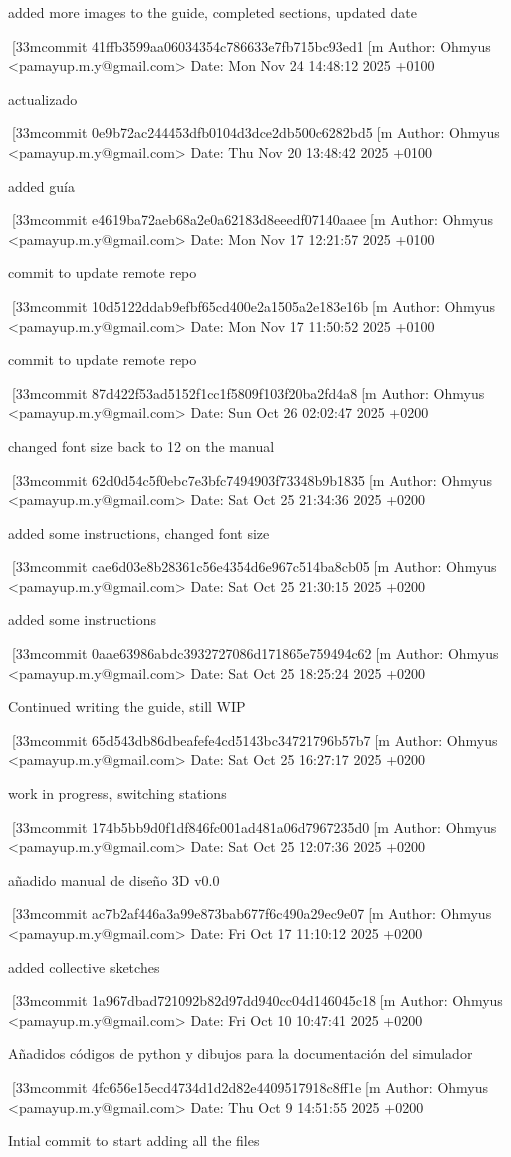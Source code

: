     added more images to the guide, completed sections, updated date

[33mcommit 41ffb3599aa06034354c786633e7fb715bc93ed1[m
Author: Ohmyus <pamayup.m.y@gmail.com>
Date:   Mon Nov 24 14:48:12 2025 +0100

    actualizado

[33mcommit 0e9b72ac244453dfb0104d3dce2db500c6282bd5[m
Author: Ohmyus <pamayup.m.y@gmail.com>
Date:   Thu Nov 20 13:48:42 2025 +0100

    added guía

[33mcommit e4619ba72aeb68a2e0a62183d8eeedf07140aaee[m
Author: Ohmyus <pamayup.m.y@gmail.com>
Date:   Mon Nov 17 12:21:57 2025 +0100

    commit to update remote repo

[33mcommit 10d5122ddab9efbf65cd400e2a1505a2e183e16b[m
Author: Ohmyus <pamayup.m.y@gmail.com>
Date:   Mon Nov 17 11:50:52 2025 +0100

    commit to update remote repo

[33mcommit 87d422f53ad5152f1cc1f5809f103f20ba2fd4a8[m
Author: Ohmyus <pamayup.m.y@gmail.com>
Date:   Sun Oct 26 02:02:47 2025 +0200

    changed font size back to 12 on the manual

[33mcommit 62d0d54c5f0ebc7e3bfc7494903f73348b9b1835[m
Author: Ohmyus <pamayup.m.y@gmail.com>
Date:   Sat Oct 25 21:34:36 2025 +0200

    added some instructions, changed font size

[33mcommit cae6d03e8b28361c56e4354d6e967c514ba8cb05[m
Author: Ohmyus <pamayup.m.y@gmail.com>
Date:   Sat Oct 25 21:30:15 2025 +0200

    added some instructions

[33mcommit 0aae63986abdc3932727086d171865e759494c62[m
Author: Ohmyus <pamayup.m.y@gmail.com>
Date:   Sat Oct 25 18:25:24 2025 +0200

    Continued writing the guide, still WIP

[33mcommit 65d543db86dbeafefe4cd5143bc34721796b57b7[m
Author: Ohmyus <pamayup.m.y@gmail.com>
Date:   Sat Oct 25 16:27:17 2025 +0200

    work in progress, switching stations

[33mcommit 174b5bb9d0f1df846fc001ad481a06d7967235d0[m
Author: Ohmyus <pamayup.m.y@gmail.com>
Date:   Sat Oct 25 12:07:36 2025 +0200

    añadido manual de diseño 3D v0.0

[33mcommit ac7b2af446a3a99e873bab677f6c490a29ec9e07[m
Author: Ohmyus <pamayup.m.y@gmail.com>
Date:   Fri Oct 17 11:10:12 2025 +0200

    added collective sketches

[33mcommit 1a967dbad721092b82d97dd940cc04d146045c18[m
Author: Ohmyus <pamayup.m.y@gmail.com>
Date:   Fri Oct 10 10:47:41 2025 +0200

    Añadidos códigos de python y dibujos para la documentación del simulador

[33mcommit 4fc656e15ecd4734d1d2d82e4409517918c8ff1e[m
Author: Ohmyus <pamayup.m.y@gmail.com>
Date:   Thu Oct 9 14:51:55 2025 +0200

    Intial commit to start adding all the files
